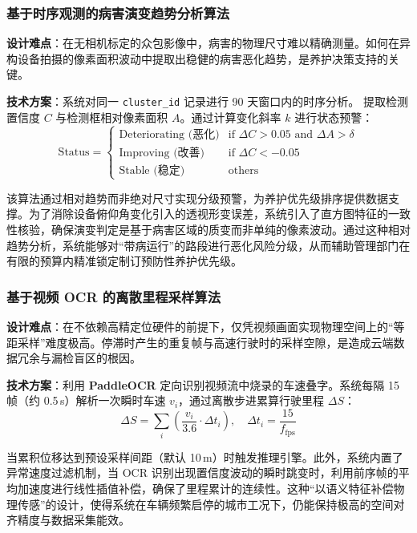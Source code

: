 \documentclass[UTF8, a4paper, fontset=ubuntu]{ctexart}
\begin{document}
\subsubsection{基于时序观测的病害演变趋势分析算法}

\textbf{设计难点}：在无相机标定的众包影像中，病害的物理尺寸难以精确测量。如何在异构设备拍摄的像素面积波动中提取出稳健的病害恶化趋势，是养护决策支持的关键。

\textbf{技术方案}：系统对同一 \texttt{cluster\_id} 记录进行 90 天窗口内的时序分析。
提取检测置信度 $C$ 与检测框相对像素面积 $A$。通过计算变化斜率 $k$ 进行状态预警：
\begin{equation}
\text{Status} = 
\begin{cases} 
\text{Deteriorating (恶化)} & \text{if } \Delta C > 0.05 \text{ and } \Delta A > \delta \\
\text{Improving (改善)} & \text{if } \Delta C < -0.05 \\
\text{Stable (稳定)} & \text{others}
\end{cases}
\end{equation}

该算法通过相对趋势而非绝对尺寸实现分级预警，为养护优先级排序提供数据支撑。为了消除设备俯仰角变化引入的透视形变误差，系统引入了直方图特征的一致性核验，确保演变判定是基于病害区域的质变而非单纯的像素波动。通过这种相对趋势分析，系统能够对“带病运行”的路段进行恶化风险分级，从而辅助管理部门在有限的预算内精准锁定制订预防性养护优先级。

\subsubsection{基于视频 OCR 的离散里程采样算法}

\textbf{设计难点}：在不依赖高精定位硬件的前提下，仅凭视频画面实现物理空间上的“等距采样”难度极高。停滞时产生的重复帧与高速行驶时的采样空隙，是造成云端数据冗余与漏检盲区的根因。

\textbf{技术方案}：利用 \textbf{PaddleOCR} \cite{paddleocr2020}定向识别视频流中烧录的车速叠字。系统每隔 15 帧（约 0.5\,s）解析一次瞬时车速 $v_i$，通过离散步进累算行驶里程 $\Delta S$：
\begin{equation}
\Delta S = \sum_{i} \left( \frac{v_i}{3.6} \cdot \Delta t_i \right), \quad \Delta t_i = \frac{15}{f_{\text{fps}}}
\end{equation}

当累积位移达到预设采样间距（默认 10\,m）时触发推理引擎。此外，系统内置了异常速度过滤机制，当 OCR 识别出现置信度波动的瞬时跳变时，利用前序帧的平均加速度进行线性插值补偿，确保了里程累计的连续性。这种“以语义特征补偿物理传感”的设计，使得系统在车辆频繁启停的城市工况下，仍能保持极高的空间对齐精度与数据采集能效。
\end{document}
